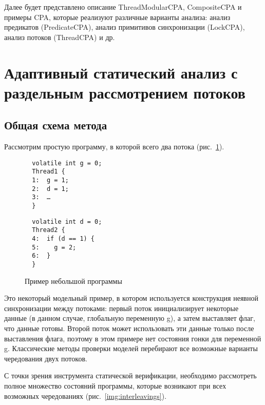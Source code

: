 Далее будет представлено описание ThreadModularCPA, CompositeCPA и примеры CPA, которые реализуют различные варианты анализа: анализ предикатов (PredicateCPA), анализ примитивов синхронизации (LockCPA), анализ потоков (ThreadCPA) и др.

\newcommand{\conctm}[1]{\conc{#1}_{TM}}

\section{Адаптивный статический анализ с раздельным рассмотрением потоков}
\label{sect_tm_cpa}

\subsection{Общая схема метода}

Рассмотрим простую программу, в которой всего два потока (рис.~\ref{fig:ExapmleTM}).

\begin{figure}[h]
\begin{minipage}[h]{0.45\textwidth}
\begin{verbatim}
  volatile int g = 0;
  Thread1 {
  1:  g = 1;
  2:  d = 1;
  3:  …
  }
\end{verbatim}
\end{minipage}
\hfill
\begin{minipage}[h]{0.45\textwidth}
\begin{verbatim}
  volatile int d = 0;
  Thread2 {
  4:  if (d == 1) {
  5:    g = 2;
  6:  }
  }
\end{verbatim}
\end{minipage}
\caption{Пример небольшой программы}
\label{fig:ExapmleTM}
\end{figure}

Это некоторый модельный пример, в котором используется конструкция неявной синхронизации между потоками: первый поток инициализирует некоторые данные (в данном случае, глобальную переменную g), а затем выставляет флаг, что данные готовы.
Второй поток может использовать эти данные только после выставления флага, поэтому в этом примере нет состояния гонки для переменной g.
Классические методы проверки моделей перебирают все возможные варианты чередования двух потоков.

С точки зрения инструмента статической верификации, необходимо рассмотреть полное множество состояний программы, которые возникают при всех возможных чередованиях  (рис.~\ref{img:interleavings}).

